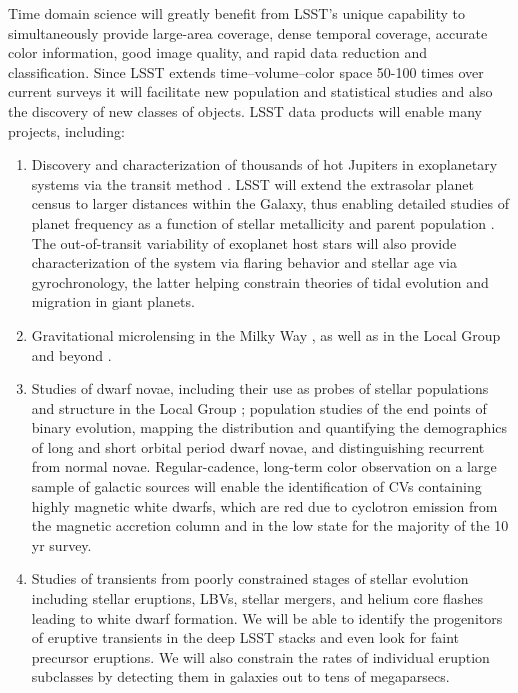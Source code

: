 Time domain science will greatly benefit from LSST's unique capability
to simultaneously provide large-area coverage, dense temporal
coverage, accurate color information, good image quality, and rapid
data reduction and classification. Since LSST extends time--volume--color
space 50-100 times over current surveys \citep[e.g.,][]{2013pss2.book..223D}
it will facilitate new population and statistical studies and also the discovery of new classes of
objects.  LSST data products will enable many projects, including:

\begin{enumerate}

\item Discovery and characterization of thousands of hot Jupiters
  in exoplanetary systems via the transit method \citep{2012ApJ...753..160W}.
LSST will extend the extrasolar planet census to larger distances within the Galaxy, thus enabling detailed studies
of planet frequency as a function of stellar metallicity and parent population \cite[e.g.,][]{2009ApJ...695..336H,2011ApJ...743..103B}.
The out-of-transit variability of exoplanet host stars will also provide characterization of the system
via flaring behavior and stellar age via gyrochronology, the latter helping constrain theories of tidal evolution and
migration in giant planets.

\item Gravitational microlensing in the Milky Way \cite[see][]{2008ApJ...681..806H}, as well as in the Local Group and beyond \citep{2008A&A...478..755D}.

\item Studies of dwarf novae, including their use as probes of stellar populations and
      structure in the Local Group
      \citep{2005AJ....129.1873N,2006AJ....131.2980S,2009ApJ...692..324S}; population
      studies of the end points of binary evolution, mapping the
      distribution and quantifying the demographics of
      long and short orbital period dwarf novae, and distinguishing
      recurrent from normal novae. Regular-cadence, long-term color
      observation on a large sample of galactic sources will enable
      the identification of CVs containing highly magnetic white
      dwarfs, which are red due to cyclotron emission from the magnetic
      accretion column and in the low state for the majority of the 10\,yr survey.

\item Studies of  transients from poorly constrained stages of stellar evolution including
stellar eruptions, LBVs, stellar mergers, and
helium core flashes leading to white dwarf formation.  We will be able
to identify the progenitors of eruptive transients in the
deep LSST stacks and even look for faint precursor eruptions.  We will
also constrain the rates of individual eruption subclasses
\citep{2014ARA&A..52..487S} by detecting them in galaxies out to tens
of megaparsecs.


\end{enumerate}
